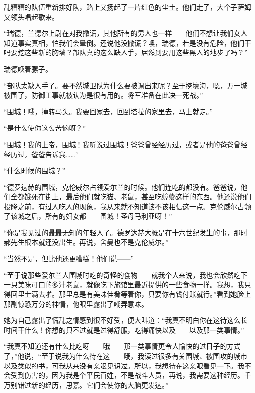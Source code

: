 \par 乱糟糟的队伍重新排好队，路上又扬起了一片红色的尘土。他们走了，大个子萨姆又领头唱起歌来。
\par “瑞德，兰德尔上尉在对我撒谎，其他所有的男人也一样——他们不想让我们女人知道事实真相，怕我们会晕倒。还说他没撒谎？噢，瑞德，若是没有危险，他们干吗要挖这些新的胸墙？部队真的这么缺人手，居然到要用这些黑人的地步了吗？”
\par 瑞德唤着骡子。
\par “部队太缺人手了。要不然城卫队为什么要被调出来呢？至于挖壕沟，嗯，万一城被围了，防御工事就被认为是很有用的。将军准备在此决一死战。”
\par “围城！哦，掉转马头。我要回家去，回到塔拉的家里去，马上就走。”
\par “是什么使你这么苦恼呀？”
\par “围城！我的上帝，围城！我听说过围城！爸爸曾经经历过，或者是他的爸爸曾经经历过。爸爸告诉我……”
\par “什么时候的围城？”
\par “德罗达赫的围城，克伦威尔占领爱尔兰的时候。他们连吃的都没有。爸爸说，他们全都饿死在街上，最后他们就吃猫、老鼠，甚至吃蟑螂这样的东西。他还说他们投降之前，有过人吃人的现象，我从来就不知道该不该相信这一点。克伦威尔占领了该城之后，所有的妇女都——围城！圣母马利亚呀！”
\par “你是我见过的最最无知的年轻人了。德罗达赫大概是在十六世纪发生的事，那时郝先生根本就还没出生。再说，舍曼也不是克伦威尔。”
\par “当然不是，但比他还更糟糕！他们说——”
\par “至于说那些爱尔兰人围城时吃的奇怪的食物——就我个人来说，我也会欣然吃下一只美味可口的多汁老鼠，就像吃下旅馆里最近提供的一些食物一样。我想，我只得回里士满去啦。那里总是有美味佳肴等着你，只要你有钱付账就行。”看到她脸上那副惊恐万分的神情，他眼里露出了嘲弄意味。
\par 她为自己露出了慌乱之情感到很不好受，便大叫道：“我真不明白你在这待这么长时间干什么！你想的只不过就是过得舒服，吃得痛快以及——以及那一类事情。”
\par “我真不知道还有什么比吃呀——哦——那一类事情更令人愉快的过日子的方式了，”他说，“至于说我为什么待在这——哦，我读过很多有关围城、被围攻的城市以及类似的书，可我从来没有亲眼见识过。所以，我想待在这亲眼看见一下。我不会受到伤害的，因为我是个平民百姓，不是战斗人员，再说，我需要这种经历。千万别错过新的经历，思嘉。它们会使你的大脑更发达。”
